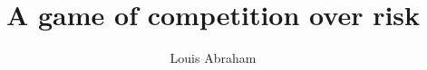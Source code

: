 \documentclass[preprint,12pt,authoryear,doubleblind]{elsarticle}
\theoremstyle{definition}
\begin{document}
\begin{frontmatter}



\title{A game of competition over risk}


\author[inst1,inst2]{Louis Abraham}

\address[inst1]{Université Paris 1 Panthéon--Sorbonne}

\address[inst2]{Association Française d'Épargne et de Retraite (AFER)}

            




\end{frontmatter}
\end{document}
